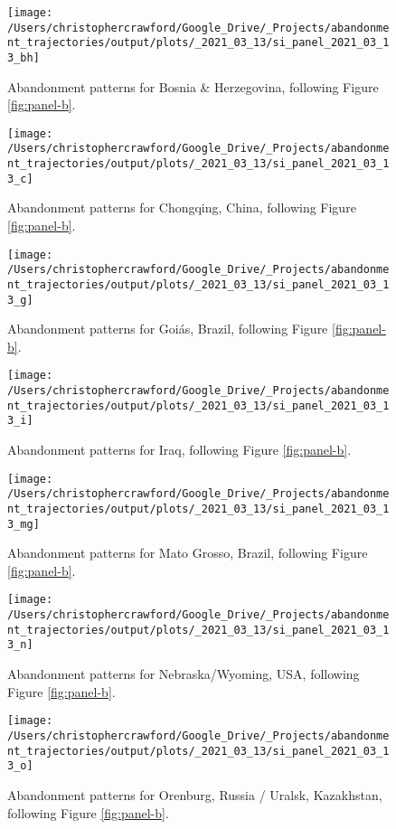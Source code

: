 \documentclass[9pt,twocolumn,twoside,]{pnas-new}
\begin{document}
\begin{figure}
\texttt{[image: /Users/christophercrawford/Google\_Drive/\_Projects/abandonment\_trajectories/output/plots/\_2021\_03\_13/si\_panel\_2021\_03\_13\_bh]} \caption{Abandonment patterns for Bosnia \& Herzegovina, following Figure \ref{fig:panel-b}.}\label{fig:panel-bh}
\end{figure}

\begin{figure}
\texttt{[image: /Users/christophercrawford/Google\_Drive/\_Projects/abandonment\_trajectories/output/plots/\_2021\_03\_13/si\_panel\_2021\_03\_13\_c]} \caption{Abandonment patterns for Chongqing, China, following Figure \ref{fig:panel-b}.}\label{fig:panel-c}
\end{figure}

\begin{figure}
\texttt{[image: /Users/christophercrawford/Google\_Drive/\_Projects/abandonment\_trajectories/output/plots/\_2021\_03\_13/si\_panel\_2021\_03\_13\_g]} \caption{Abandonment patterns for Goiás, Brazil, following Figure \ref{fig:panel-b}.}\label{fig:panel-g}
\end{figure}

\begin{figure}
\texttt{[image: /Users/christophercrawford/Google\_Drive/\_Projects/abandonment\_trajectories/output/plots/\_2021\_03\_13/si\_panel\_2021\_03\_13\_i]} \caption{Abandonment patterns for Iraq, following Figure \ref{fig:panel-b}.}\label{fig:panel-i}
\end{figure}

\begin{figure}
\texttt{[image: /Users/christophercrawford/Google\_Drive/\_Projects/abandonment\_trajectories/output/plots/\_2021\_03\_13/si\_panel\_2021\_03\_13\_mg]} \caption{Abandonment patterns for Mato Grosso, Brazil, following Figure \ref{fig:panel-b}.}\label{fig:panel-mg}
\end{figure}

\begin{figure}
\texttt{[image: /Users/christophercrawford/Google\_Drive/\_Projects/abandonment\_trajectories/output/plots/\_2021\_03\_13/si\_panel\_2021\_03\_13\_n]} \caption{Abandonment patterns for Nebraska/Wyoming, USA, following Figure \ref{fig:panel-b}.}\label{fig:panel-n}
\end{figure}

\begin{figure}
\texttt{[image: /Users/christophercrawford/Google\_Drive/\_Projects/abandonment\_trajectories/output/plots/\_2021\_03\_13/si\_panel\_2021\_03\_13\_o]} \caption{Abandonment patterns for Orenburg, Russia / Uralsk, Kazakhstan, following Figure \ref{fig:panel-b}.}\label{fig:panel-o}
\end{figure}
\end{document}
